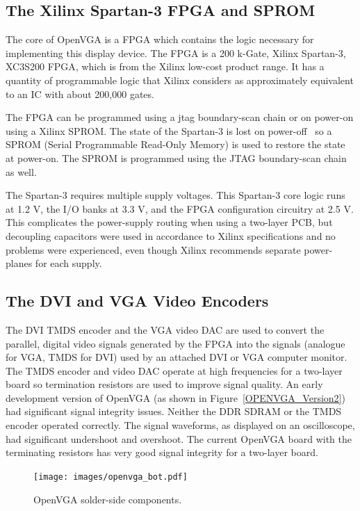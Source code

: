 \subsection{The Xilinx Spartan-3 FPGA and SPROM}
The core of OpenVGA is a FPGA which contains the logic necessary for implementing
this display device. The FPGA is a 200 k-Gate, Xilinx Spartan-3, XC3S200 FPGA,
which is from the Xilinx low-cost product range. It has a quantity of
programmable logic that Xilinx considers as approximately equivalent to an IC
with about 200,000 gates.

The FPGA can be programmed using a \gls{jtag} boundary-scan chain or on power-on using a Xilinx SPROM. The
state of the Spartan-3 is lost on power-off~\cite{Xilinx_SP3_DS} so a SPROM
(Serial Programmable Read-Only Memory) is used to restore the state at power-on.
The SPROM is programmed using the JTAG boundary-scan chain as well.

The Spartan-3 requires multiple supply voltages. This Spartan-3 core logic runs
at 1.2 V, the I/O banks at 3.3 V, and the FPGA configuration circuitry at 2.5 V.
This complicates the power-supply routing when using a two-layer PCB, but
decoupling capacitors were used in accordance to Xilinx specifications and no
problems were experienced, even though Xilinx recommends separate power-planes
for each supply.


\subsection{The DVI and VGA Video Encoders}
The DVI TMDS encoder and the VGA video DAC are used to convert the parallel,
digital video signals generated by the FPGA into the signals (analogue for VGA,
TMDS for DVI) used by an attached DVI or VGA computer monitor. The TMDS encoder
and video DAC operate at high frequencies for a two-layer board so termination
resistors are used to improve signal quality. An early development version of
OpenVGA (as shown in Figure~\ref{OPENVGA_Version2}) had significant signal
integrity issues. Neither the DDR SDRAM or the TMDS encoder operated correctly.
The signal waveforms, as displayed on an oscilloscope, had significant undershoot
and overshoot. The current OpenVGA board with the terminating resistors has very
good signal integrity for a two-layer board.

\begin{figure}[h!]
\begin{center}
\texttt{[image: images/openvga\_bot.pdf]}
\end{center}
\caption[OpenVGA solder-side components]{OpenVGA solder-side components.}
\label{HARD_Bot}
\end{figure}


